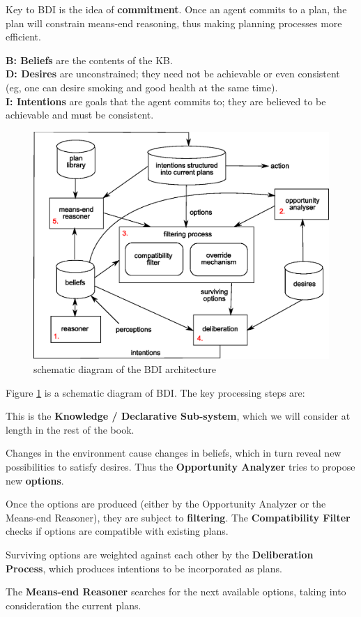 Key to BDI is the idea of \textbf{commitment}.  Once an agent commits to a plan, the plan will constrain means-end reasoning, thus making planning processes more efficient.

\textbf{B: Beliefs} are the contents of the KB.\\
\textbf{D: Desires} are unconstrained;  they need not be achievable or even consistent (eg, one can desire smoking and good health at the same time).\\
\textbf{I: Intentions} are goals that the agent commits to;  they are believed to be achievable and must be consistent.

\begin{figure}[t]
\centering
\includegraphics[scale=0.6]{BDI-architecture.eps}
\caption{schematic diagram of the BDI architecture}
\label{fig:BDI-arch}
\end{figure}

Figure \ref{fig:BDI-arch} is a schematic diagram of BDI.  The key processing steps are:
\begin{compactenum}
\item  This is the \textbf{Knowledge / Declarative Sub-system}, which we will consider at length in the rest of the book.
\item  Changes in the environment cause changes in beliefs, which in turn reveal new possibilities to satisfy desires.  Thus the \textbf{Opportunity Analyzer} tries to propose new \textbf{options}.
\item  Once the options are produced (either by the Opportunity Analyzer or the Means-end Reasoner), they are subject to \textbf{filtering}.  The \textbf{Compatibility Filter} checks if options are compatible with existing plans.
\item  Surviving options are weighted against each other by the \textbf{Deliberation Process}, which produces intentions to be incorporated as plans.
\item  The \textbf{Means-end Reasoner} searches for the next available options, taking into consideration the current plans.
\end{compactenum}

